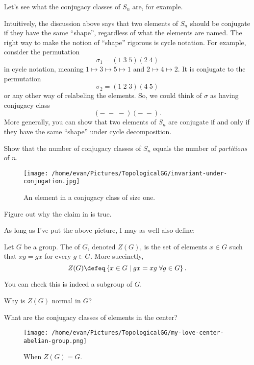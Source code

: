 Let's see what the conjugacy classes of $S_n$ are, for example.
\begin{example}
	Intuitively, the discussion above says that two elements of $S_n$ should
	be conjugate if they have the same ``shape'', regardless of what the elements are named.
	The right way to make the notion of ``shape'' rigorous is cycle notation.
	For example, consider the permutation
	\[ \sigma_1 = (1 \; 3 \; 5)(2 \; 4) \]
	in cycle notation, meaning $1 \mapsto 3 \mapsto 5 \mapsto 1$ and $2 \mapsto 4 \mapsto 2$.
	It is conjugate to the permutation
	\[ \sigma_2 = (1 \; 2 \; 3)(4 \; 5) \]
	or any other way of relabeling the elements.
	So, we could think of $\sigma$ as having conjugacy class
	\[ (- \; - \; -)(- \; -). \]
	More generally, you can show that two elements of $S_n$ are conjugate
	if and only if they have the same ``shape'' under cycle decomposition.
\end{example}
\begin{ques}
	Show that the number of conjugacy classes of $S_n$
	equals the number of \emph{partitions} of $n$.
\end{ques}

\begin{figure}[ht]
	\centering
	\texttt{[image: /home/evan/Pictures/TopologicalGG/invariant-under-conjugation.jpg]}
	\caption{An element in a conjugacy class of size one.}
	\label{fig:snsd_conjugation}
\end{figure}
\begin{ques}
	Figure out why the claim in  is true.
\end{ques}


As long as I've put the above picture, I may as well also define:
\begin{definition}
	Let $G$ be a group.
	The  of $G$, denoted $Z(G)$, is the set of elements $x \in G$
	such that $xg = gx$ for every $g \in G$.
	More succinctly,
	\[ Z(G) \defeq \left\{ x \in G \mid gx=xg \; \forall g \in G \right\}. \]
\end{definition}
You can check this is indeed a subgroup of $G$.
\begin{ques}
	Why is $Z(G)$ normal in $G$?
\end{ques}
\begin{ques}
	What are the conjugacy classes of elements in the center?
\end{ques}

\begin{figure}[ht]
	\centering
	\texttt{[image: /home/evan/Pictures/TopologicalGG/my-love-center-abelian-group.png]}
	\caption{When $Z(G)=G$.}
\end{figure}

